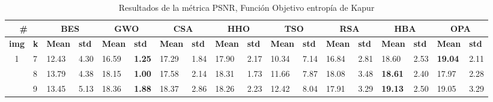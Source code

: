\documentclass[conference]{IEEEtran}
\begin{document}
\begin{table}[]
	\caption{Resultados de la métrica PSNR, Función Objetivo entropía de Kapur}
	\begin{tabular}{|cl|ll|ll|ll|ll|ll|ll|ll|ll|}
		\hline
		\multicolumn{2}{|c|}{\textbf{\#}} & \multicolumn{2}{c|}{\textbf{BES}} & \multicolumn{2}{c|}{\textbf{GWO}} & \multicolumn{2}{c|}{\textbf{CSA}} & \multicolumn{2}{c|}{\textbf{HHO}} & \multicolumn{2}{c|}{\textbf{TSO}} & \multicolumn{2}{c|}{\textbf{RSA}} & \multicolumn{2}{c|}{\textbf{HBA}} & \multicolumn{2}{c|}{\textbf{OPA}} \\ \hline
		\multicolumn{1}{|l|}{\textbf{img}}        & \textbf{k} & \multicolumn{1}{l|}{\textbf{Mean}} & \textbf{std}  & \multicolumn{1}{l|}{\textbf{Mean}}  & \textbf{std}  & \multicolumn{1}{l|}{\textbf{Mean}}  & \textbf{std}  & \multicolumn{1}{l|}{\textbf{Mean}}  & \textbf{std}  & \multicolumn{1}{l|}{\textbf{Mean}}        & \textbf{std} & \multicolumn{1}{l|}{\textbf{Mean}} & \textbf{std} & \multicolumn{1}{l|}{\textbf{Mean}}  & \textbf{std}  & \multicolumn{1}{l|}{\textbf{Mean}}  & \textbf{std}  \\ \hline
		\multicolumn{1}{|c|}{\multirow{3}{*}{1}}  & 7          & \multicolumn{1}{l|}{12.43}         & 4.30          & \multicolumn{1}{l|}{16.59}          & \textbf{1.25} & \multicolumn{1}{l|}{17.29}          & 1.84          & \multicolumn{1}{l|}{17.90}          & 2.17          & \multicolumn{1}{l|}{10.34}                & 7.14  & \multicolumn{1}{l|}{16.84} & 2.81 & \multicolumn{1}{l|}{18.60}          & 2.53          & \multicolumn{1}{l|}{\textbf{19.04}} & 2.11          \\ \cline{2-18} 
		\multicolumn{1}{|c|}{}                    & 8          & \multicolumn{1}{l|}{13.79}         & 4.38          & \multicolumn{1}{l|}{18.15}          & \textbf{1.00} & \multicolumn{1}{l|}{17.58}          & 2.14          & \multicolumn{1}{l|}{18.31}          & 1.73          & \multicolumn{1}{l|}{11.66}                & 7.87  & \multicolumn{1}{l|}{18.08} & 3.48 & \multicolumn{1}{l|}{\textbf{18.61}} & 2.40          & \multicolumn{1}{l|}{17.97}          & 2.28          \\ \cline{2-18} 
		\multicolumn{1}{|c|}{}                    & 9          & \multicolumn{1}{l|}{13.45}         & 5.13          & \multicolumn{1}{l|}{18.36}          & \textbf{1.88} & \multicolumn{1}{l|}{18.37}          & 2.86          & \multicolumn{1}{l|}{18.26}          & 2.23          & \multicolumn{1}{l|}{12.42}                & 8.04  & \multicolumn{1}{l|}{17.91} & 3.29 & \multicolumn{1}{l|}{\textbf{19.13}} & 2.50          & \multicolumn{1}{l|}{19.05}          & 3.29          \\ \hline

\end{tabular}
\end{table}
\end{document}
